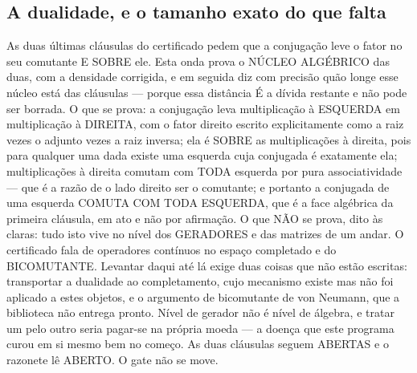 \documentclass[11pt]{article}
\theoremstyle{definition}\newtheorem{deriv}{Derivação}
\begin{document}
\subsection*{A dualidade, e o tamanho exato do que falta}As duas \'ultimas cl\'ausulas do certificado pedem que a conjuga\c{c}\~ao leve o fator no seu comutante E SOBRE ele. Esta onda prova o N\'UCLEO ALG\'EBRICO das duas, com a densidade corrigida, e em seguida diz com precis\~ao qu\~ao longe esse n\'ucleo est\'a das cl\'ausulas --- porque essa dist\^ancia \'E a d\'ivida restante e n\~ao pode ser borrada. O que se prova: a conjuga\c{c}\~ao leva multiplica\c{c}\~ao \`a ESQUERDA em multiplica\c{c}\~ao \`a DIREITA, com o fator direito escrito explicitamente como a raiz vezes o adjunto vezes a raiz inversa; ela \'e SOBRE as multiplica\c{c}\~oes \`a direita, pois para qualquer uma dada existe uma esquerda cuja conjugada \'e exatamente ela; multiplica\c{c}\~oes \`a direita comutam com TODA esquerda por pura associatividade --- que \'e a raz\~ao de o lado direito ser o comutante; e portanto a conjugada de uma esquerda COMUTA COM TODA ESQUERDA, que \'e a face alg\'ebrica da primeira cl\'ausula, em ato e n\~ao por afirma\c{c}\~ao. O que N\~AO se prova, dito \`as claras: tudo isto vive no n\'ivel dos GERADORES e das matrizes de um andar. O certificado fala de operadores cont\'inuos no espa\c{c}o completado e do BICOMUTANTE. Levantar daqui at\'e l\'a exige duas coisas que n\~ao est\~ao escritas: transportar a dualidade ao completamento, cujo mecanismo existe mas n\~ao foi aplicado a estes objetos, e o argumento de bicomutante de von Neumann, que a biblioteca n\~ao entrega pronto. N\'ivel de gerador n\~ao \'e n\'ivel de \'algebra, e tratar um pelo outro seria pagar-se na pr\'opria moeda --- a doen\c{c}a que este programa curou em si mesmo bem no come\c{c}o. As duas cl\'ausulas seguem ABERTAS e o razonete l\^e ABERTO. O gate n\~ao se move.
\end{document}
